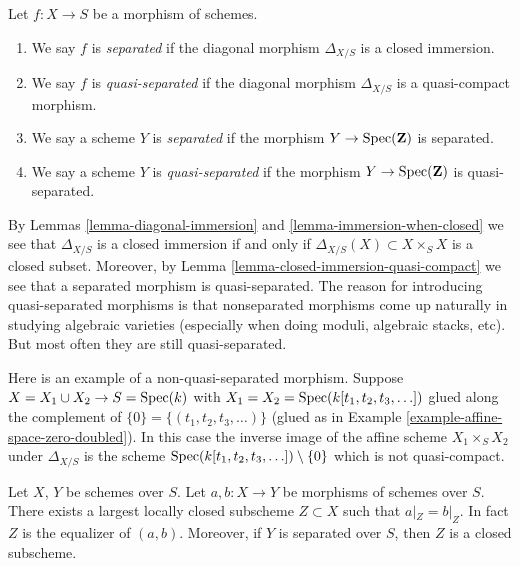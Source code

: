 \begin{definition}
\label{definition-separated}
Let $f : X \to S$ be a morphism of schemes.
\begin{enumerate}
\item We say $f$ is {\it separated} if the diagonal morphism $\Delta_{X/S}$
is a closed immersion.
\item We say $f$ is {\it quasi-separated} if the diagonal morphism
$\Delta_{X/S}$ is a quasi-compact morphism.
\item We say a scheme $Y$ is {\it separated} if the morphism
$Y \to \mathop{\mathrm{Spec}}(\mathbf{Z})$ is separated.
\item We say a scheme $Y$ is {\it quasi-separated} if the morphism
$Y \to \mathop{\mathrm{Spec}}(\mathbf{Z})$ is quasi-separated.
\end{enumerate}
\end{definition}

\noindent
By Lemmas \ref{lemma-diagonal-immersion} and \ref{lemma-immersion-when-closed}
we see that $\Delta_{X/S}$ is a closed immersion if and only if
$\Delta_{X/S}(X) \subset X \times_S X$ is a closed subset. Moreover,
by Lemma \ref{lemma-closed-immersion-quasi-compact} we see that a
separated morphism is quasi-separated. The reason for introducing
quasi-separated morphisms is that nonseparated morphisms come up naturally
in studying algebraic varieties (especially when doing moduli,
algebraic stacks, etc). But most often they are still quasi-separated.

\begin{example}
\label{example-not-quasi-separated}
Here is an example of a non-quasi-separated morphism.
Suppose $X = X_1 \cup X_2 \to S = \mathop{\mathrm{Spec}}(k)$ with
$X_1 = X_2 = \mathop{\mathrm{Spec}}(k[t_1, t_2, t_3, \ldots])$
glued along the complement of $\{0\} = \{(t_1, t_2, t_3, \ldots)\}$
(glued as in Example \ref{example-affine-space-zero-doubled}).
In this case the inverse image of the affine scheme
$X_1 \times_S X_2$ under $\Delta_{X/S}$ is the scheme
$\mathop{\mathrm{Spec}}(k[t_1, t_2, t_3, \ldots]) \setminus \{0\}$
which is not quasi-compact.
\end{example}

\begin{lemma}
\label{lemma-where-are-they-equal}
Let $X$, $Y$ be schemes over $S$.
Let $a, b : X \to Y$ be morphisms of schemes over $S$.
There exists a largest locally closed subscheme
$Z \subset X$ such that $a|_Z = b|_Z$. In fact $Z$ is
the equalizer of $(a, b)$. Moreover, if $Y$ is separated
over $S$, then $Z$ is a closed subscheme.
\end{lemma}

